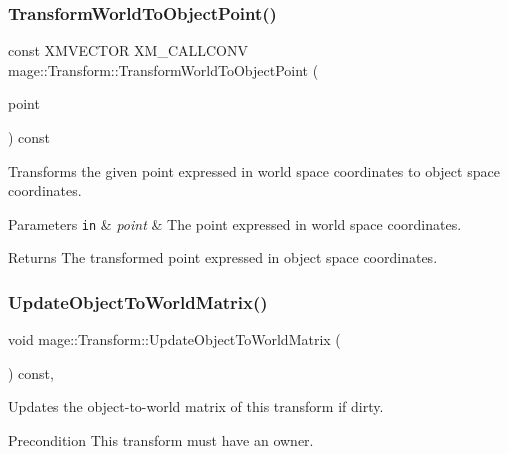 \subsubsection{\texorpdfstring{Transform\+World\+To\+Object\+Point()}{TransformWorldToObjectPoint()}}
{\footnotesize\ttfamily const X\+M\+V\+E\+C\+T\+OR X\+M\+\_\+\+C\+A\+L\+L\+C\+O\+NV mage\+::\+Transform\+::\+Transform\+World\+To\+Object\+Point (\begin{DoxyParamCaption}\item[{F\+X\+M\+V\+E\+C\+T\+OR}]{point }\end{DoxyParamCaption}) const\hspace{0.3cm}{\ttfamily [noexcept]}}

Transforms the given point expressed in world space coordinates to object space coordinates.


\begin{DoxyParams}[1]{Parameters}
\mbox{\tt in}  & {\em point} & The point expressed in world space coordinates. \\
\hline
\end{DoxyParams}
\begin{DoxyReturn}{Returns}
The transformed point expressed in object space coordinates. 
\end{DoxyReturn}
\mbox{\label{classmage_1_1_transform_a237fb0afa443909983e83f2e3863f4dd}} 
\subsubsection{\texorpdfstring{Update\+Object\+To\+World\+Matrix()}{UpdateObjectToWorldMatrix()}}
{\footnotesize\ttfamily void mage\+::\+Transform\+::\+Update\+Object\+To\+World\+Matrix (\begin{DoxyParamCaption}{ }\end{DoxyParamCaption}) const\hspace{0.3cm}{\ttfamily [private]}, {\ttfamily [noexcept]}}

Updates the object-\/to-\/world matrix of this transform if dirty.

\begin{DoxyPrecond}{Precondition}
This transform must have an owner. 
\end{DoxyPrecond}
\mbox{\label{classmage_1_1_transform_a0cdac8ab1ae9570e6829fd88365df031}} 
